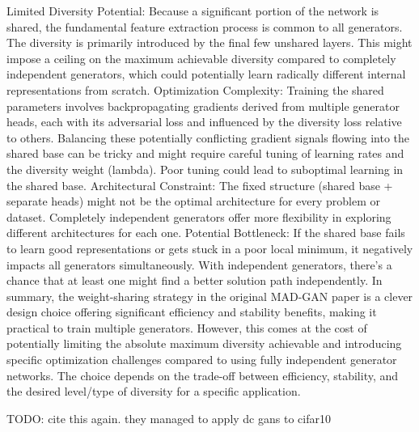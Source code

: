 Limited Diversity Potential: Because a significant portion of the network is shared, the fundamental feature extraction process is common to all generators. The diversity is primarily introduced by the final few unshared layers. This might impose a ceiling on the maximum achievable diversity compared to completely independent generators, which could potentially learn radically different internal representations from scratch.
Optimization Complexity: Training the shared parameters involves backpropagating gradients derived from multiple generator heads, each with its adversarial loss and influenced by the diversity loss relative to others. Balancing these potentially conflicting gradient signals flowing into the shared base can be tricky and might require careful tuning of learning rates and the diversity weight (lambda). Poor tuning could lead to suboptimal learning in the shared base.
Architectural Constraint: The fixed structure (shared base + separate heads) might not be the optimal architecture for every problem or dataset. Completely independent generators offer more flexibility in exploring different architectures for each one.
Potential Bottleneck: If the shared base fails to learn good representations or gets stuck in a poor local minimum, it negatively impacts all generators simultaneously. With independent generators, there's a chance that at least one might find a better solution path independently.
In summary, the weight-sharing strategy in the original MAD-GAN paper is a clever design choice offering significant efficiency and stability benefits, making it practical to train multiple generators. However, this comes at the cost of potentially limiting the absolute maximum diversity achievable and introducing specific optimization challenges compared to using fully independent generator networks. The choice depends on the trade-off between efficiency, stability, and the desired level/type of diversity for a specific application.

\cite{zhao2023gan}
TODO: cite this again. they managed to apply dc gans to cifar10 

